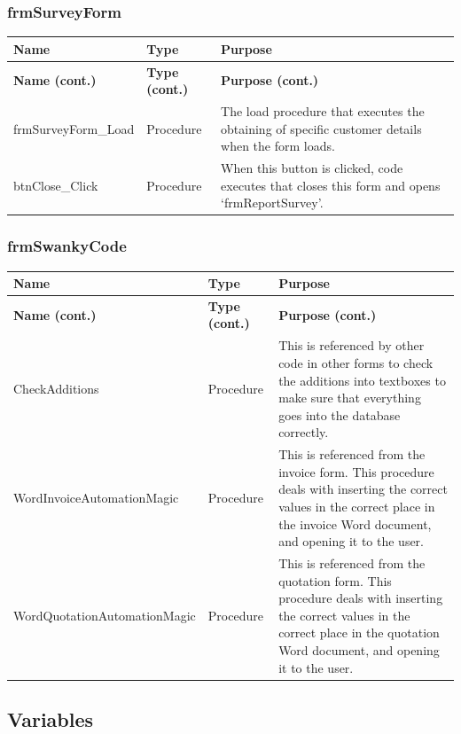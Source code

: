 	\subsubsection{frmSurveyForm}
	\begin{longtable}{ | p{5cm} | p{3cm} | p{9cm} | }
		\hline
		\textbf{Name} & \textbf{Type} & \textbf{Purpose}\\
		\endfirsthead
		\hline
		\textbf{Name (cont.)} & \textbf{Type (cont.)} & \textbf{Purpose (cont.)}\\
		\endhead
		\hline
		frmSurveyForm\_Load & Procedure & The load procedure that executes the obtaining of specific customer details when the form loads.\\
		\hline
		btnClose\_Click & Procedure & When this button is clicked, code executes that closes this form and opens `frmReportSurvey'.\\
		\hline
	\end{longtable}
	
	\subsubsection{frmSwankyCode}
	\begin{longtable}{ | p{5cm} | p{3cm} | p{9cm} | }
		\hline
		\textbf{Name} & \textbf{Type} & \textbf{Purpose}\\
		\endfirsthead
		\hline
		\textbf{Name (cont.)} & \textbf{Type (cont.)} & \textbf{Purpose (cont.)}\\
		\endhead
		\hline
		CheckAdditions & Procedure & This is referenced by other code in other forms to check the additions into textboxes to make sure that everything goes into the database correctly.\\
		\hline
		WordInvoiceAutomationMagic & Procedure & This is referenced from the invoice form.  This procedure deals with inserting the correct values in the correct place in the invoice Word document, and opening it to the user.\\
		\hline
		WordQuotationAutomationMagic & Procedure & This is referenced from the quotation form.  This procedure deals with inserting the correct values in the correct place in the quotation Word document, and opening it to the user.\\
		\hline
	\end{longtable}
	
	\subsection{Variables}
	
